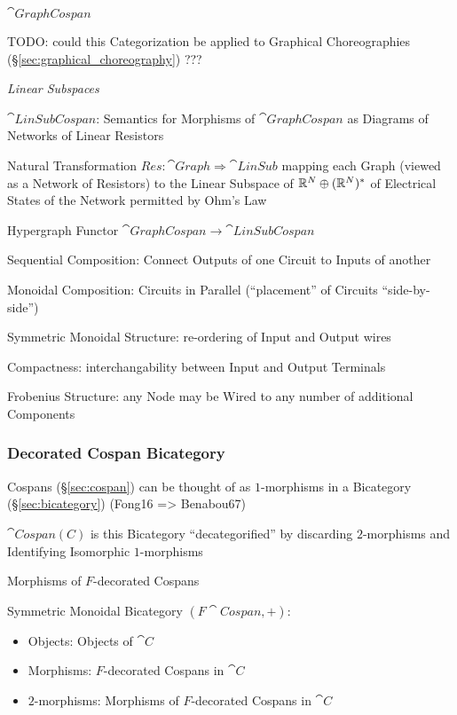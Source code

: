 $\cat{GraphCospan}$

TODO: could this Categorization be applied to Graphical Choreographies
(\S\ref{sec:graphical_choreography}) ???


\emph{Linear Subspaces}

$\cat{LinSubCospan}$: Semantics for Morphisms of $\cat{GraphCospan}$
as Diagrams of Networks of Linear Resistors

Natural Transformation $Res : \cat{Graph} \Rightarrow \cat{LinSub}$
mapping each Graph (viewed as a Network of Resistors) to the Linear
Subspace of $\mathbb{R}^N \oplus (\mathbb{R}^N)^*$ of Electrical States of the
Network permitted by Ohm's Law

Hypergraph Functor $\cat{GraphCospan} \rightarrow \cat{LinSubCospan}$

Sequential Composition: Connect Outputs of one Circuit to Inputs of
another

Monoidal Composition: Circuits in Parallel (``placement'' of Circuits
``side-by-side'')

Symmetric Monoidal Structure: re-ordering of Input and Output wires

Compactness: interchangability between Input and Output Terminals

Frobenius Structure: any Node may be Wired to any number of additional
Components



\subsubsection{Decorated Cospan Bicategory}
\label{sec:decorated_cospan_bicategory}

Cospans (\S\ref{sec:cospan}) can be thought of as $1$-morphisms in a
Bicategory (\S\ref{sec:bicategory}) (Fong16 => Benabou67)

$\cat{Cospan(C)}$ is this Bicategory ``decategorified'' by discarding
$2$-morphisms and Identifying Isomorphic $1$-morphisms

Morphisms of $F$-decorated Cospans

Symmetric Monoidal Bicategory $(F\cat{Cospan}, +)$:
\begin{itemize}
  \item Objects: Objects of $\cat{C}$
  \item Morphisms: $F$-decorated Cospans in $\cat{C}$
  \item $2$-morphisms: Morphisms of $F$-decorated Cospans in $\cat{C}$
\end{itemize}

